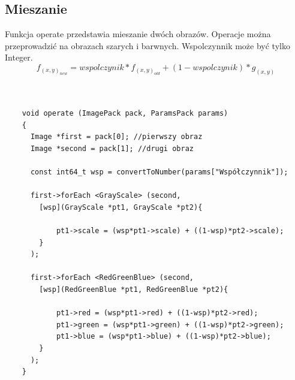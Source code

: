 \documentclass{article}
\begin{document}
\FloatBarrier
\subsection{Mieszanie}
Funkcja operate przedstawia mieszanie dwóch obrazów. Operacje można przeprowadzić na obrazach szarych i barwnych. Wspolczynnik może być tylko Integer.
\begin{equation*}
f_(x,y)_{new} = wspolczynik*f_(x,y)_{old}+(1-wspolczynik)*g_(x,y)
\end{equation*}\\
\begin{Verbatim}[frame=single,label=Mieszanie (Source Code)]

    void operate (ImagePack pack, ParamsPack params)
    {
      Image *first = pack[0]; //pierwszy obraz
      Image *second = pack[1]; //drugi obraz

      const int64_t wsp = convertToNumber(params["Współczynnik"]);

      first->forEach <GrayScale> (second,
        [wsp](GrayScale *pt1, GrayScale *pt2){
        
        	pt1->scale = (wsp*pt1->scale) + ((1-wsp)*pt2->scale);
        }
      );

      first->forEach <RedGreenBlue> (second,
        [wsp](RedGreenBlue *pt1, RedGreenBlue *pt2){
        	
        	pt1->red = (wsp*pt1->red) + ((1-wsp)*pt2->red);
        	pt1->green = (wsp*pt1->green) + ((1-wsp)*pt2->green);
       	    pt1->blue = (wsp*pt1->blue) + ((1-wsp)*pt2->blue);
        }
      );
    }

\end{Verbatim}
\end{document}
